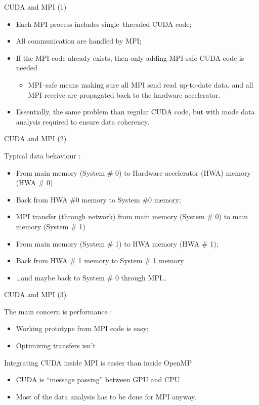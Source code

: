 \documentclass{beamer}
\begin{document}
\begin{frame}{CUDA and MPI (1)}

\begin{itemize}
\item Each MPI process includes single--threaded CUDA code;
\item All communication are handled by MPI;
\item If the MPI code already exists, then only adding MPI-safe
  CUDA code is needed
  \begin{itemize}
  \item MPI--safe means making sure all MPI send read up-to-date data,
    and all MPI receive are propagated back to the hardware accelerator.
  \end{itemize}
\item Essentially, the same problem than regular CUDA code, but with mode data
  analysis required to ensure data coherency.
\end{itemize}
\end{frame}

\begin{frame}{CUDA and MPI (2)}

Typical data behaviour :
\begin{itemize}
\item From main memory (System \# 0) to Hardware accelerator (HWA) memory (HWA
  \# 0)
\item Back from HWA \#0 memory to System \#0 memory;
\item MPI transfer (through network) from main memory (System \# 0) to
  main memory (System \# 1)
\item From main memory (System \# 1) to HWA memory (HWA \# 1);
\item Back from HWA \# 1 memory to System \# 1 memory
\item \ldots and maybe back to System \# 0 through MPI\ldots
\end{itemize}

\end{frame}

\begin{frame}{CUDA and MPI (3)}

The main concern is performance :
\begin{itemize}
\item Working prototype from MPI code is easy;
\item Optimizing transfers isn't
\end{itemize}

Integrating CUDA inside MPI is easier than inside OpenMP
\begin{itemize}
\item CUDA is ``message passing'' between GPU and CPU
\item Most of the data analysis has to be done for MPI anyway.
\end{itemize}
\end{frame}
\end{document}
